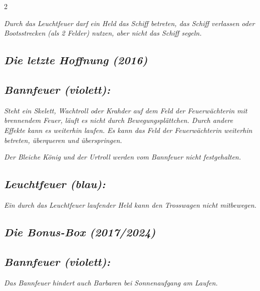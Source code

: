\documentclass[10pt, a4paper, oneside]{book}
\newcommand{\fan}[1]{\textit{#1}}
\begin{document}
\begin{multicols*}{2}
\begin{bgcolor}
\fan{Durch das Leuchtfeuer darf ein Held das Schiff betreten, das Schiff verlassen oder Bootsstrecken (als 2 Felder) nutzen, aber nicht das Schiff segeln.}

\end{bgcolor}





\begin{bgcolor}
\section{\fan{Die letzte Hoffnung (2016)}}


\subsection{\fan{Bannfeuer (violett):}}

\fan{Steht ein Skelett, Wachtroll oder Krahder auf dem Feld der Feuerwächterin mit brennendem Feuer, läuft es nicht durch Bewegungsplättchen. Durch andere Effekte kann es weiterhin laufen. Es kann das Feld der Feuerwächterin weiterhin betreten, überqueren und überspringen.}

\fan{Der Bleiche König und der Urtroll werden vom Bannfeuer nicht festgehalten.}


\subsection{\fan{Leuchtfeuer (blau):}}


\fan{Ein durch das Leuchtfeuer laufender Held kann den Trosswagen nicht mitbewegen.}

\end{bgcolor}



\columnbreak



\begin{bgcolor}[color-BB]
\section{\fan{Die Bonus-Box (2017/2024)}}

\subsection{\fan{Bannfeuer (violett):}}

\fan{Das Bannfeuer hindert auch Barbaren bei Sonnenaufgang am Laufen.}


\end{bgcolor}
\end{multicols*}
\end{document}
